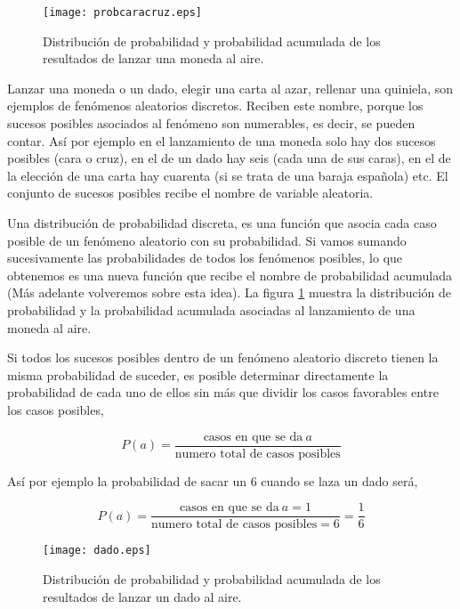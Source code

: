 \begin{figure}
\centering
\texttt{[image: probcaracruz.eps]}
\caption{Distribución de probabilidad y probabilidad acumulada de los resultados de lanzar una moneda al aire.}
\label{fig:moneda}
\end{figure}


Lanzar una moneda o un dado, elegir una carta al azar, rellenar una quiniela, son ejemplos de fenómenos aleatorios discretos. Reciben este nombre, porque los sucesos posibles asociados al fenómeno son numerables, es decir, se pueden contar.  Así por ejemplo en el lanzamiento de una moneda solo hay dos sucesos posibles (cara o cruz), en el de un dado hay seis (cada una de sus caras), en el de la elección de una carta hay cuarenta (si se trata de una baraja española) etc. El conjunto de sucesos posibles recibe el nombre de variable aleatoria. 

Una distribución de probabilidad discreta, es una función que asocia cada caso posible de un fenómeno aleatorio con su probabilidad. Si vamos sumando sucesivamente las probabilidades de todos los fenómenos posibles, lo que obtenemos es una nueva función que recibe el nombre de probabilidad acumulada (Más adelante volveremos sobre esta idea). La figura \ref{fig:moneda} muestra la distribución de probabilidad y la probabilidad acumulada asociadas al lanzamiento de una moneda al aire.

Si todos los sucesos posibles dentro de un fenómeno aleatorio discreto tienen la misma probabilidad de suceder,  es posible determinar directamente la probabilidad de cada uno de ellos sin más que  dividir los casos favorables  entre los casos posibles,

\begin{equation*}
P(a)=\frac{\text{casos en que se da} \ a}{\text{numero total de casos posibles}}
\end{equation*}

Así por ejemplo la probabilidad de sacar un $6$ cuando se laza un dado será,

\begin{equation*}
P(a)=\frac{\text{casos en que se da}\ a=1}{\text{numero total de casos posibles}=6}=\frac{1}{6}
\end{equation*}

\begin{figure}
\centering
\texttt{[image: dado.eps]}
\caption{Distribución de probabilidad y probabilidad acumulada de los resultados de lanzar un dado al aire.}
\label{fig:dado}
\end{figure}


